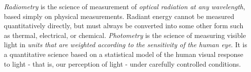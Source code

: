 \textit{Radiometry} is the science of measurement of \textit{optical radiation at any wavelength}, based simply on physical measurements. Radiant energy cannot be measured quantitatively directly, but must always be converted into some other form such as thermal, electrical, or chemical. 
\textit{Photometry} is the science of measuring visible light in \textit{units that are weighted according to the sensitivity of the human eye}. It is a quantitative science based on a statistical model of the human visual response to light - that is, our perception of light - under carefully controlled conditions.



